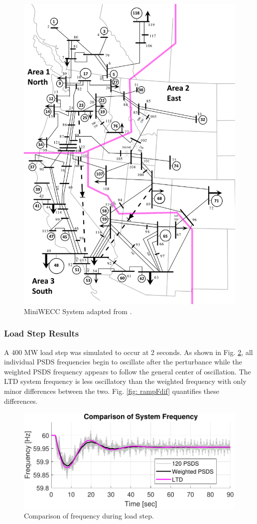 \begin{figure}[!ht]
	\centering
	\includegraphics[width=.65\linewidth]{figures/miniWECC_split03}
	\caption{MiniWECC System adapted from \cite{RJminiWECC}.}
	\label{fig: miniWECC}
\end{figure}

\subsubsection{Load Step Results}
A 400 MW load step was simulated to occur at 2 seconds.
As shown in Fig. \ref{fig: stepFcomp}, all individual PSDS frequencies begin to oscillate after the perturbance while the weighted PSDS frequency appears to follow the general center of oscillation. The LTD system frequency is less oscillatory than the weighted frequency with only minor differences between the two. Fig. \ref{fig: rampFdif} quantifies these differences.

\begin{figure}[!t]
	\centering
	\includegraphics[width=\linewidth]{figures/miniWECC3ALTDstepF3}
	\caption{Comparison of frequency during load step.}
	\label{fig: stepFcomp}
\end{figure}

